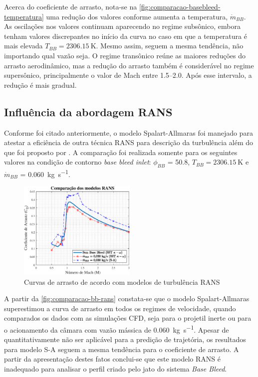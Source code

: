 Acerca do coeficiente de arrasto, nota-se na \autoref{fig:comparacao-basebleed-temperatura} uma redução dos valores conforme aumenta a temperatura, \(\Dot{m}_{BB}\). As oscilações nos valores continuam aparecendo no regime subsônico, embora tenham valores discrepantes no início da curva no caso em que a temperatura é mais elevada \(T_{BB} = \qty{2306,15}{\kelvin}\). Mesmo assim, seguem a mesma tendência, não importando qual vazão seja. O regime transônico reúne as maiores reduções do arrasto aerodinâmico, mas a redução do arrasto também é considerável no regime supersônico, principalmente o valor de Mach entre \numrange{1,5}{2,0}. Após esse intervalo, a redução é mais gradual.

\subsection{Influência da abordagem RANS}\label{subsec:resultados-com-basebleed-RANS}

Conforme foi citado anteriormente, o modelo Spalart-Allmaras \cite{Spalart1992} foi manejado para atestar a eficiência de outra técnica RANS para descrição da turbulência além do que foi proposto por \citeauthor{Menter1994TwoequationET}. A comparação foi realizada somente para os seguintes valores na condição de contorno \textit{base bleed inlet}: \(\phi_{BB}\) = \qty{50,8}{\millimetre}, \(T_{BB} = \qty{2306,15}{\kelvin}\) e \(\Dot{m}_{BB}\) = \qty{0,060}{\kilogram\per\second}.

\begin{figure}[!ht]
    \centering
    \includegraphics[width=0.5\textwidth]{cd-combasebleed-rans.eps}
 	\caption{Curvas de arrasto de acordo com modelos de turbulência RANS}
    \label{fig:comparacao-bb-rans}
\end{figure}

A partir da \autoref{fig:comparacao-bb-rans} constata-se que o modelo Spalart-Allmaras superestimou a curva de arrasto em todos os regimes de velocidade, quando comparados os dados com as simulações CFD, seja para o projetil inerte ou para o acionamento da câmara com vazão mássica de \qty{0,060}{\kilogram\per\second}. Apesar de quantitativamente não ser aplicável para a predição de trajetória, os resultados para modelo S-A seguem a mesma tendência para o coeficiente de arrasto. A partir da apresentação destes fatos conclui-se que este modelo RANS é inadequado para analisar o perfil criado pelo jato do sistema \textit{Base Bleed}.

